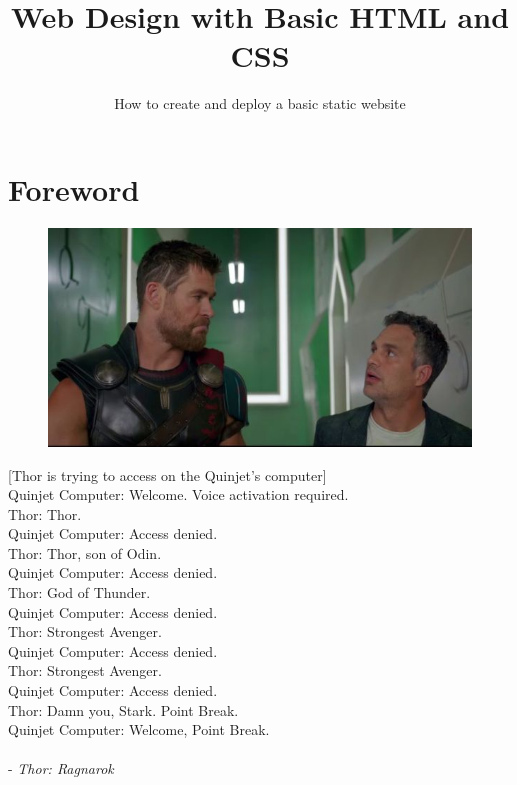 \documentclass{42-en}
\begin{document}
                           \title{Web Design with Basic HTML and CSS}
                          \subtitle{How to create and deploy a basic static website}


\maketitle

\tableofcontents


\chapter{Foreword}

    \begin{figure}[H]
        \begin{center}
            \includegraphics[width=12cm]{thor.jpg}
        \end{center}
    \end{figure}
    [Thor is trying to access on the Quinjet’s computer]\\
Quinjet Computer: Welcome. Voice activation required.\\
Thor: Thor.\\
Quinjet Computer: Access denied.\\
Thor: Thor, son of Odin.\\
Quinjet Computer: Access denied.\\
Thor: God of Thunder.\\
Quinjet Computer: Access denied.\\
Thor: Strongest Avenger.\\
Quinjet Computer: Access denied.\\
Thor: Strongest Avenger.\\
Quinjet Computer: Access denied.\\
Thor: Damn you, Stark. Point Break.\\
Quinjet Computer: Welcome, Point Break.\\
\\
- \textit{Thor: Ragnarok}
    
\end{document}

